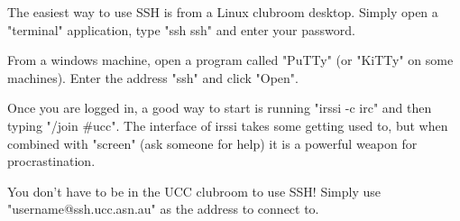 The easiest way to use SSH is from a Linux clubroom desktop. Simply open a "terminal" application, type "ssh ssh" and enter your password.

From a windows machine, open a program called "PuTTy" (or "KiTTy" on some machines). Enter the address "ssh" and click "Open".

Once you are logged in, a good way to start is running "irssi -c irc" and then typing "/join \#ucc". The interface of irssi takes some getting used to, but when combined with "screen" (ask someone for help) it is a powerful weapon for procrastination.

You don't have to be in the UCC clubroom to use SSH! Simply use "username@ssh.ucc.asn.au" as the address to connect to.



